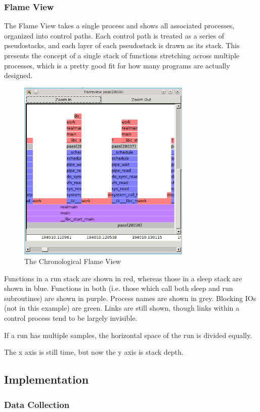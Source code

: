 \documentclass[10pt]{article}
\begin{document}
\subsubsection{Flame View}

The Flame View takes a single process and shows all associated processes, organized into control paths.  Each control path is treated as a series of pseudostacks, and each layer of each pseudostack is drawn as its stack.  This presents the concept of a single stack of functions stretching across multiple processes, which is a pretty good fit for how many programs are actually designed.

\begin{figure}[h]
\includegraphics[width=3.25in]{flameshot}
\caption{The Chronological Flame View}
\end{figure}

Functions in a run stack are shown in red, whereas those in a sleep stack are shown in blue.  Functions in both (i.e. those which call both sleep and run subroutines) are shown in purple. Process names are shown in grey.  Blocking IOs (not in this example) are green.  Links are still shown, though links within a control process tend to be largely invisible.

If a run has multiple samples, the horizontal space of the run is divided equally.

The x axis is still time, but now the y axis is stack depth.

\subsection{Implementation}
\subsubsection{Data Collection}
\end{document}
